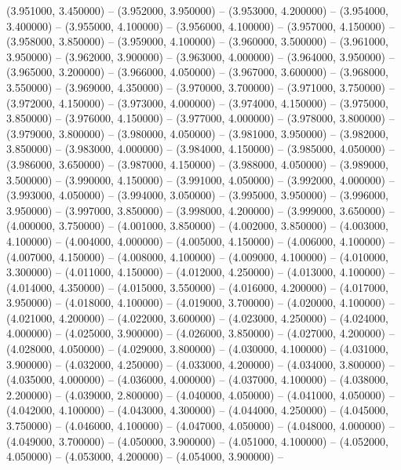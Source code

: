 (3.951000, 3.450000) -- 
(3.952000, 3.950000) -- 
(3.953000, 4.200000) -- 
(3.954000, 3.400000) -- 
(3.955000, 4.100000) -- 
(3.956000, 4.100000) -- 
(3.957000, 4.150000) -- 
(3.958000, 3.850000) -- 
(3.959000, 4.100000) -- 
(3.960000, 3.500000) -- 
(3.961000, 3.950000) -- 
(3.962000, 3.900000) -- 
(3.963000, 4.000000) -- 
(3.964000, 3.950000) -- 
(3.965000, 3.200000) -- 
(3.966000, 4.050000) -- 
(3.967000, 3.600000) -- 
(3.968000, 3.550000) -- 
(3.969000, 4.350000) -- 
(3.970000, 3.700000) -- 
(3.971000, 3.750000) -- 
(3.972000, 4.150000) -- 
(3.973000, 4.000000) -- 
(3.974000, 4.150000) -- 
(3.975000, 3.850000) -- 
(3.976000, 4.150000) -- 
(3.977000, 4.000000) -- 
(3.978000, 3.800000) -- 
(3.979000, 3.800000) -- 
(3.980000, 4.050000) -- 
(3.981000, 3.950000) -- 
(3.982000, 3.850000) -- 
(3.983000, 4.000000) -- 
(3.984000, 4.150000) -- 
(3.985000, 4.050000) -- 
(3.986000, 3.650000) -- 
(3.987000, 4.150000) -- 
(3.988000, 4.050000) -- 
(3.989000, 3.500000) -- 
(3.990000, 4.150000) -- 
(3.991000, 4.050000) -- 
(3.992000, 4.000000) -- 
(3.993000, 4.050000) -- 
(3.994000, 3.050000) -- 
(3.995000, 3.950000) -- 
(3.996000, 3.950000) -- 
(3.997000, 3.850000) -- 
(3.998000, 4.200000) -- 
(3.999000, 3.650000) -- 
(4.000000, 3.750000) -- 
(4.001000, 3.850000) -- 
(4.002000, 3.850000) -- 
(4.003000, 4.100000) -- 
(4.004000, 4.000000) -- 
(4.005000, 4.150000) -- 
(4.006000, 4.100000) -- 
(4.007000, 4.150000) -- 
(4.008000, 4.100000) -- 
(4.009000, 4.100000) -- 
(4.010000, 3.300000) -- 
(4.011000, 4.150000) -- 
(4.012000, 4.250000) -- 
(4.013000, 4.100000) -- 
(4.014000, 4.350000) -- 
(4.015000, 3.550000) -- 
(4.016000, 4.200000) -- 
(4.017000, 3.950000) -- 
(4.018000, 4.100000) -- 
(4.019000, 3.700000) -- 
(4.020000, 4.100000) -- 
(4.021000, 4.200000) -- 
(4.022000, 3.600000) -- 
(4.023000, 4.250000) -- 
(4.024000, 4.000000) -- 
(4.025000, 3.900000) -- 
(4.026000, 3.850000) -- 
(4.027000, 4.200000) -- 
(4.028000, 4.050000) -- 
(4.029000, 3.800000) -- 
(4.030000, 4.100000) -- 
(4.031000, 3.900000) -- 
(4.032000, 4.250000) -- 
(4.033000, 4.200000) -- 
(4.034000, 3.800000) -- 
(4.035000, 4.000000) -- 
(4.036000, 4.000000) -- 
(4.037000, 4.100000) -- 
(4.038000, 2.200000) -- 
(4.039000, 2.800000) -- 
(4.040000, 4.050000) -- 
(4.041000, 4.050000) -- 
(4.042000, 4.100000) -- 
(4.043000, 4.300000) -- 
(4.044000, 4.250000) -- 
(4.045000, 3.750000) -- 
(4.046000, 4.100000) -- 
(4.047000, 4.050000) -- 
(4.048000, 4.000000) -- 
(4.049000, 3.700000) -- 
(4.050000, 3.900000) -- 
(4.051000, 4.100000) -- 
(4.052000, 4.050000) -- 
(4.053000, 4.200000) -- 
(4.054000, 3.900000) -- 
